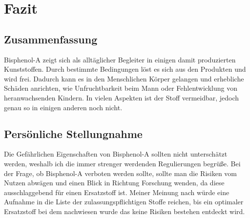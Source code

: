 \section{Fazit}
\subsection{Zusammenfassung}
Bisphenol-A zeigt sich als alltäglicher Begleiter in einigen damit produzierten Kunststoffen. Durch bestimmte Bedingungen löst es sich aus den Produkten und wird frei. Dadurch kann es in den Menschlichen Körper gelangen und erhebliche Schäden anrichten, wie Unfruchtbarkeit beim Mann oder Fehlentwicklung von heranwachsenden Kindern. In vielen Aspekten ist der Stoff vermeidbar, jedoch genau so in einigen anderen noch nicht.
\subsection{Persönliche Stellungnahme}
Die Gefährlichen Eigenschaften von Bisphenol-A sollten nicht unterschätzt werden, weshalb ich die immer strenger werdenden Regulierungen begrüße. Bei der Frage, ob Bisphenol-A verboten werden sollte, sollte man die Risiken vom Nutzen abwägen und einen Blick in Richtung Forschung wenden, da diese ausschlaggebend für einen Ersatzstoff ist. Meiner Meinung nach würde eine Aufnahme in die Liste der zulassungspflichtigen Stoffe reichen, bis ein optimaler Ersatzstoff bei dem nachwiesen wurde das keine Risiken bestehen entdeckt wird.
